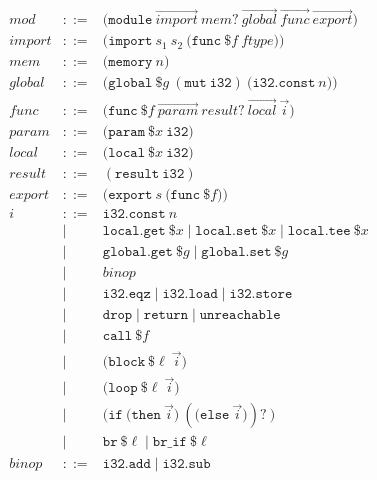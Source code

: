 \begin{figure}[htbp]
  \[
    \begin{array}{lcll}
      \mathit{mod}  &::=&
      \mathtt{(module}\ \vec{\mathit{import}}\ \mathit{mem}?\ \vec{\mathit{global}}\ \vec{\mathit{func}}\ \vec{\mathit{export}}\mathtt{)}
      \\[4pt]
      \mathit{import} &::=&
      \mathtt{(import}\ s_1\ s_2\ \mathtt{(func}\ \$f\ \mathit{ftype}\mathtt{))}
      \\
      \mathit{mem}   &::=& \mathtt{(memory}\ n\mathtt{)} \\
      \mathit{global} &::=&
      \mathtt{(global}\ \$g\ \mathtt{(mut\ i32)}\ \mathtt{(i32.const}\ n\mathtt{))}
      \\
      \mathit{func}  &::=&
      \mathtt{(func}\ \$f\ \vec{\mathit{param}}\ \mathit{result}?\ \vec{\mathit{local}}\ \vec{i}\mathtt{)}
      \\
      \mathit{param} &::=& \mathtt{(param}\ \$x\ \mathtt{i32)} \\
      \mathit{local} &::=& \mathtt{(local}\ \$x\ \mathtt{i32)} \\
      \mathit{result} &::=& \mathtt{(result\ i32)} \\
      \mathit{export} &::=&
      \mathtt{(export}\ s\ \mathtt{(func}\ \$f\mathtt{))} \\[4pt]
      i &::=& \mathtt{i32.const}\ n \\
      &\mid& \mathtt{local.get}\ \$x \mid \mathtt{local.set}\ \$x
      \mid \mathtt{local.tee}\ \$x \\
      &\mid& \mathtt{global.get}\ \$g \mid \mathtt{global.set}\ \$g \\
      &\mid& \mathit{binop} \\
      &\mid& \mathtt{i32.eqz} \mid \mathtt{i32.load} \mid \mathtt{i32.store} \\
      &\mid& \mathtt{drop} \mid \mathtt{return} \mid \mathtt{unreachable} \\
      &\mid& \mathtt{call}\ \$f \\
      &\mid& \mathtt{(block}\ \$\ell\ \vec{i}\mathtt{)} \\
      &\mid& \mathtt{(loop}\ \$\ell\ \vec{i}\mathtt{)} \\
      &\mid&
      \mathtt{(if}\ \mathtt{(then}\ \vec{i}\mathtt{)}\ (\mathtt{(else}\ \vec{i}\mathtt{)})?\ \mathtt{)}
      \\
      &\mid& \mathtt{br}\ \$\ell \mid \mathtt{br\_if}\ \$\ell \\[4pt]
      \mathit{binop} &::=& \mathtt{i32.add} \mid \mathtt{i32.sub}

\end{array}\]
\end{figure}

